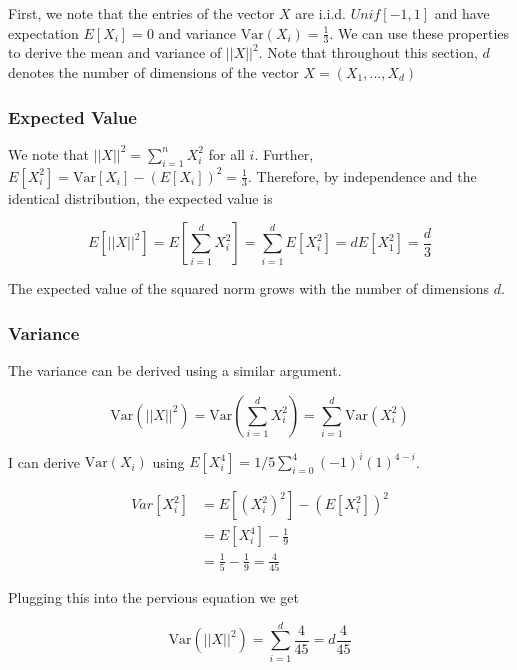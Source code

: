 \documentclass[a4paper, 11pt]{article} %
\begin{document}
First, we note that the entries of the vector $X$ are i.i.d. $Unif[-1,1]$ and have expectation $E[X_i] = 0$ and variance $\text{Var}(X_i)= \frac{1}{3}$. We can use these properties to derive the mean and variance of $||X||^2$. Note that throughout this section, $d$ denotes the number of dimensions of the vector $X = (X_1, ... , X_d)$

\subsubsection{Expected Value}

We note that $||X||^2 = \sum_{i=1}^n X_i^2$ for all $i$. Further, $E[X_i^2] = \text{Var}[X_i] - (E[X_i])^2 = \frac{1}{3}$. Therefore, by independence and the identical distribution, the expected value is

\begin{equation*}
E[||X||^2] = E[\sum_{i=1}^d X_i^2] = \sum_{i=1}^d E[X_i^2] = d E[X_1^2] = \frac{d}{3}
\end{equation*}

The expected value of the squared norm grows with the number of dimensions $d$.

\subsubsection{Variance}

The variance can be derived using a similar argument. 

\begin{equation*}
\text{Var}(||X||^2) = \text{Var} \left(\sum_{i=1}^d X_i^2 \right) = \sum_{i=1}^d \text{Var}(X_i^2) 
\end{equation*}

I can derive $\text{Var}(X_i)$ using $E[X_i^4] = 1/5  \sum_{i=0}^4 (-1)^i (1)^{4-i}$.
 
\begin{equation*}
\begin{split}
Var[X_i^2] &= E[(X_i^2)^2] - \left( E[X_i^2] \right)^2 \\
&= E[X_i^4] - \frac{1}{9} \\
&= \frac{1}{5} - \frac{1}{9} = \frac{4}{45} 
\end{split}
\end{equation*}

Plugging this into the pervious equation we get

\begin{equation*}
\text{Var}(||X||^2) = \sum_{i=1}^d \frac{4}{45} = d\frac{4}{45}
\end{equation*}
\end{document}
